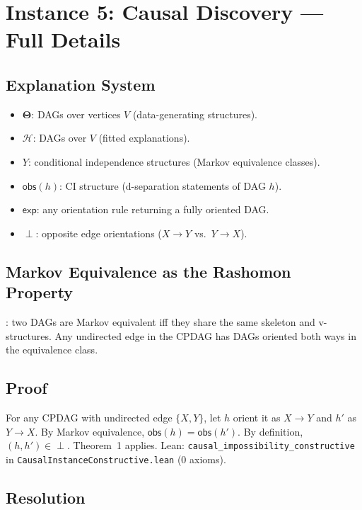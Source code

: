 \documentclass{article}
\newcommand{\Params}{\mathbf{\Theta}}
\newcommand{\sH}{\mathcal{H}}
\newcommand{\incomp}{\perp}
\begin{document}
\section{Instance 5: Causal Discovery --- Full Details}
\label{sec:causal-full}

\subsection{Explanation System}

\begin{itemize}
  \item $\Params$: DAGs over vertices $V$ (data-generating structures).
  \item $\sH$: DAGs over $V$ (fitted explanations).
  \item $Y$: conditional independence structures (Markov equivalence classes).
  \item $\mathsf{obs}(h)$: CI structure (d-separation statements of DAG $h$).
  \item $\mathsf{exp}$: any orientation rule returning a fully oriented DAG.
  \item $\incomp$: opposite edge orientations ($X \to Y$ vs.\ $Y \to X$).
\end{itemize}

\subsection{Markov Equivalence as the Rashomon Property}

\citet{verma1991equivalence}: two DAGs are Markov equivalent iff they share the same skeleton and v-structures.  Any undirected edge in the CPDAG has DAGs oriented both ways in the equivalence class.

\subsection{Proof}

For any CPDAG with undirected edge $\{X,Y\}$, let $h$ orient it as $X \to Y$ and $h'$ as $Y \to X$.  By Markov equivalence, $\mathsf{obs}(h) = \mathsf{obs}(h')$.  By definition, $(h, h') \in \incomp$.  Theorem~1 applies.  Lean: \texttt{causal\_impossibility\_constructive} in \texttt{CausalInstanceConstructive.lean} (0 axioms).

\subsection{Resolution}
\end{document}
